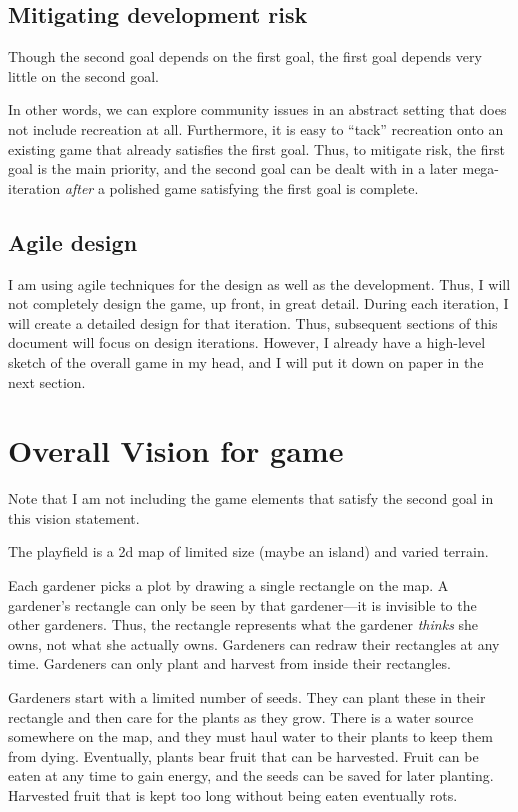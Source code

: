 \documentclass[12pt]{article}
\begin{document}
\subsection{Mitigating development risk}
Though the second goal depends on the first goal, the first goal depends very little on the second goal.

In other words, we can explore community issues in an abstract setting that does not include recreation at all.
Furthermore, it is easy to ``tack'' recreation onto an existing game that already satisfies the first goal.
Thus, to mitigate risk, the first goal is the main priority, and the second goal can be dealt with in a later mega-iteration {\it after} a polished game satisfying the first goal is complete.


\subsection{Agile design}

I am using agile techniques for the design as well as the development.
Thus, I will not completely design the game, up front, in great detail.
During each iteration, I will create a detailed design for that iteration.
Thus, subsequent sections of this document will focus on design iterations.
However, I already have a high-level sketch of the overall game in my head, and I will put it down on paper in the next section.


\section{Overall Vision for game}

Note that I am not including the game elements that satisfy the second goal in this vision statement.

The playfield is a 2d map of limited size (maybe an island) and varied terrain.

Each gardener picks a plot by drawing a single rectangle on the map.
A gardener's rectangle can only be seen by that gardener---it is invisible to the other gardeners.
Thus, the rectangle represents what the gardener {\it thinks} she owns, not what she actually owns.
Gardeners can redraw their rectangles at any time.
Gardeners can only plant and harvest from inside their rectangles.

Gardeners start with a limited number of seeds.
They can plant these in their rectangle and then care for the plants as they grow.
There is a water source somewhere on the map, and they must haul water to their plants to keep them from dying.
Eventually, plants bear fruit that can be harvested.
Fruit can be eaten at any time to gain energy, and the seeds can be saved for later planting.
Harvested fruit that is kept too long without being eaten eventually rots.
\end{document}

